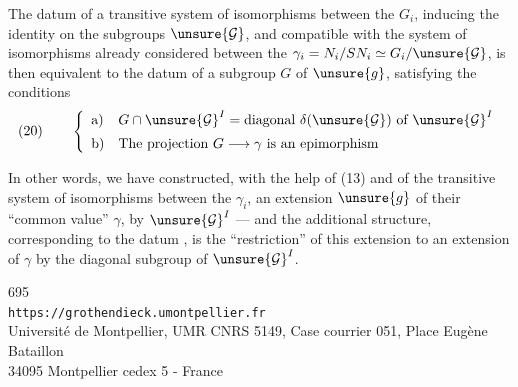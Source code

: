 The datum of a transitive system of isomorphisms between the $G_i$, inducing the identity on the subgroups $\unsure{\mathcal G}$, and compatible with the system   of isomorphisms already considered between the $\gamma_i=N_i/SN_i\simeq G_i/\unsure{\mathcal G}$, is then equivalent to the datum of a subgroup $G$ of $\unsure{g}$, satisfying the conditions
\[
(20)\qquad 
\left\{\begin{array}{ll}
\text{a)}&G\cap\unsure{\mathcal G}^I=\text{diagonal }\delta(\unsure{\mathcal G})\text{ of }\unsure{\mathcal G}^I\\[5pt]
\text{b)}&\text{The projection }G\longrightarrow\gamma\text{ is an epimorphism}
\end{array}\right.
\]

In other words, we have constructed, with the help of (13) and of the transitive system of isomorphisms between the $\gamma_i$, an extension $\unsure{g}$ of their ``common value'' $\gamma$, by $\unsure{\mathcal G}^I$ --- and the additional structure, corresponding to the datum , is the ``restriction'' of this extension to an extension of $\gamma$ by the diagonal subgroup of $\unsure{\mathcal G}^I$.


\begin{center}
695\\
\texttt{https://grothendieck.umontpellier.fr}\\
Université de Montpellier, UMR CNRS 5149, Case courrier 051, Place Eugène Bataillon\\
34095 Montpellier cedex 5 - France
\end{center}
